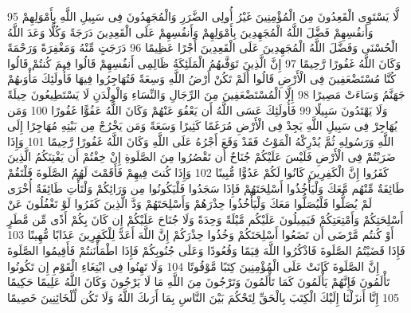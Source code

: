 {\tiny\colorbox{cl_aya}{95}} لَّا يَسْتَوِى الْقَعِدُونَ مِنَ الْمُؤْمِنِينَ غَيْرُ أُولِى الضَّرَرِ وَالْمُجَهِدُونَ فِى سَبِيلِ اللَّهِ بِأَمْوَلِهِمْ وَأَنفُسِهِمْ فَضَّلَ اللَّهُ الْمُجَهِدِينَ بِأَمْوَلِهِمْ وَأَنفُسِهِمْ عَلَى الْقَعِدِينَ دَرَجَةً وَكُلًّا وَعَدَ اللَّهُ الْحُسْنَى وَفَضَّلَ اللَّهُ الْمُجَهِدِينَ عَلَى الْقَعِدِينَ أَجْرًا عَظِيمًا
{\tiny\colorbox{cl_aya}{96}} دَرَجَتٍ مِّنْهُ وَمَغْفِرَةً وَرَحْمَةً وَكَانَ اللَّهُ غَفُورًا رَّحِيمًا
{\tiny\colorbox{cl_aya}{97}} إِنَّ الَّذِينَ تَوَفَّىهُمُ الْمَلَئِكَةُ ظَالِمِى أَنفُسِهِمْ قَالُوا فِيمَ كُنتُمْ قَالُوا كُنَّا مُسْتَضْعَفِينَ فِى الْأَرْضِ قَالُوا أَلَمْ تَكُنْ أَرْضُ اللَّهِ وَسِعَةً فَتُهَاجِرُوا فِيهَا فَأُولَئِكَ مَأْوَىهُمْ جَهَنَّمُ وَسَاءَتْ مَصِيرًا
{\tiny\colorbox{cl_aya}{98}} إِلَّا الْمُسْتَضْعَفِينَ مِنَ الرِّجَالِ وَالنِّسَاءِ وَالْوِلْدَنِ لَا يَسْتَطِيعُونَ حِيلَةً وَلَا يَهْتَدُونَ سَبِيلًا
{\tiny\colorbox{cl_aya}{99}} فَأُولَئِكَ عَسَى اللَّهُ أَن يَعْفُوَ عَنْهُمْ وَكَانَ اللَّهُ عَفُوًّا غَفُورًا
{\tiny\colorbox{cl_aya}{100}} وَمَن يُهَاجِرْ فِى سَبِيلِ اللَّهِ يَجِدْ فِى الْأَرْضِ مُرَغَمًا كَثِيرًا وَسَعَةً وَمَن يَخْرُجْ مِن بَيْتِهِ مُهَاجِرًا إِلَى اللَّهِ وَرَسُولِهِ ثُمَّ يُدْرِكْهُ الْمَوْتُ فَقَدْ وَقَعَ أَجْرُهُ عَلَى اللَّهِ وَكَانَ اللَّهُ غَفُورًا رَّحِيمًا
{\tiny\colorbox{cl_aya}{101}} وَإِذَا ضَرَبْتُمْ فِى الْأَرْضِ فَلَيْسَ عَلَيْكُمْ جُنَاحٌ أَن تَقْصُرُوا مِنَ الصَّلَوةِ إِنْ خِفْتُمْ أَن يَفْتِنَكُمُ الَّذِينَ كَفَرُوا إِنَّ الْكَفِرِينَ كَانُوا لَكُمْ عَدُوًّا مُّبِينًا
{\tiny\colorbox{cl_aya}{102}} وَإِذَا كُنتَ فِيهِمْ فَأَقَمْتَ لَهُمُ الصَّلَوةَ فَلْتَقُمْ طَائِفَةٌ مِّنْهُم مَّعَكَ وَلْيَأْخُذُوا أَسْلِحَتَهُمْ فَإِذَا سَجَدُوا فَلْيَكُونُوا مِن وَرَائِكُمْ وَلْتَأْتِ طَائِفَةٌ أُخْرَى لَمْ يُصَلُّوا فَلْيُصَلُّوا مَعَكَ وَلْيَأْخُذُوا حِذْرَهُمْ وَأَسْلِحَتَهُمْ وَدَّ الَّذِينَ كَفَرُوا لَوْ تَغْفُلُونَ عَنْ أَسْلِحَتِكُمْ وَأَمْتِعَتِكُمْ فَيَمِيلُونَ عَلَيْكُم مَّيْلَةً وَحِدَةً وَلَا جُنَاحَ عَلَيْكُمْ إِن كَانَ بِكُمْ أَذًى مِّن مَّطَرٍ أَوْ كُنتُم مَّرْضَى أَن تَضَعُوا أَسْلِحَتَكُمْ وَخُذُوا حِذْرَكُمْ إِنَّ اللَّهَ أَعَدَّ لِلْكَفِرِينَ عَذَابًا مُّهِينًا
{\tiny\colorbox{cl_aya}{103}} فَإِذَا قَضَيْتُمُ الصَّلَوةَ فَاذْكُرُوا اللَّهَ قِيَمًا وَقُعُودًا وَعَلَى جُنُوبِكُمْ فَإِذَا اطْمَأْنَنتُمْ فَأَقِيمُوا الصَّلَوةَ إِنَّ الصَّلَوةَ كَانَتْ عَلَى الْمُؤْمِنِينَ كِتَبًا مَّوْقُوتًا
{\tiny\colorbox{cl_aya}{104}} وَلَا تَهِنُوا فِى ابْتِغَاءِ الْقَوْمِ إِن تَكُونُوا تَأْلَمُونَ فَإِنَّهُمْ يَأْلَمُونَ كَمَا تَأْلَمُونَ وَتَرْجُونَ مِنَ اللَّهِ مَا لَا يَرْجُونَ وَكَانَ اللَّهُ عَلِيمًا حَكِيمًا
{\tiny\colorbox{cl_aya}{105}} إِنَّا أَنزَلْنَا إِلَيْكَ الْكِتَبَ بِالْحَقِّ لِتَحْكُمَ بَيْنَ النَّاسِ بِمَا أَرَىكَ اللَّهُ وَلَا تَكُن لِّلْخَائِنِينَ خَصِيمًا
